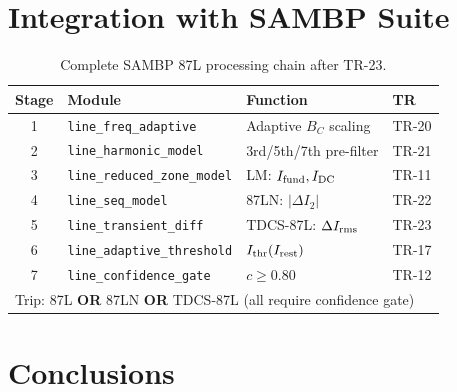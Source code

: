 \documentclass[11pt, a4paper]{article}
\begin{document}
\section{Integration with SAMBP Suite}
\label{sec:integration}

\begin{table}[h]
  \centering
  \caption{Complete SAMBP 87L processing chain after TR-23.}
  \label{tab:chain}
  \begin{tabular}{clll}
    \toprule
    Stage & Module & Function & TR \\
    \midrule
    1 & \texttt{line\_freq\_adaptive} & Adaptive $B_C$ scaling & TR-20 \\
    2 & \texttt{line\_harmonic\_model} & 3rd/5th/7th pre-filter & TR-21 \\
    3 & \texttt{line\_reduced\_zone\_model} & LM: $I_{\rm fund}, I_{\rm DC}$ & TR-11 \\
    4 & \texttt{line\_seq\_model} & 87LN: $|\Delta I_2|$ & TR-22 \\
    5 & \texttt{line\_transient\_diff} & TDCS-87L: $\Delta I_{\rm rms}$ & TR-23 \\
    6 & \texttt{line\_adaptive\_threshold} & $I_{\rm thr}(I_{\rm rest})$ & TR-17 \\
    7 & \texttt{line\_confidence\_gate} & $c \geq 0.80$ & TR-12 \\
    \midrule
    \multicolumn{4}{l}{Trip: 87L \textbf{OR} 87LN \textbf{OR} TDCS-87L (all require confidence gate)} \\
    \bottomrule
  \end{tabular}
\end{table}


\section{Conclusions}
\label{sec:conclusions}
\end{document}
